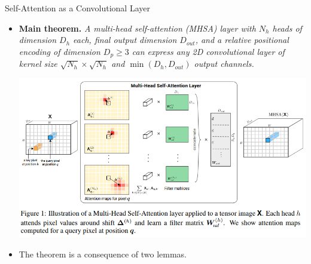 \documentclass[9pt]{beamer}
\begin{document}
\begin{frame}{Self-Attention as a Convolutional Layer}
\begin{itemize}
\item \textbf{Main theorem.} \emph{A {\em multi-head self-attention} (MHSA) layer with $N_h$ heads of dimension $D_h$ each, final output dimension $D_{out}$, and a {\em relative positional encoding} of dimension $D_p\geq3$ can express any 2D convolutional layer of kernel size $\sqrt{N_h}\times\sqrt{N_h}$ and $\min(D_h, D_{out})$ output channels.}

\begin{center}
    \includegraphics[width=.8\textwidth]{presentation/images/sa_as_conv.png}
\end{center}
\vspace{-.1in}

\item The theorem is a consequence of two lemmas.

\end{itemize}
\end{frame}
\end{document}
